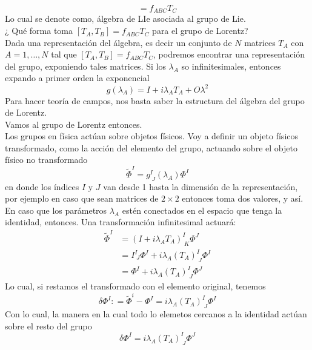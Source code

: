 \documentclass[../main.tex]{subfiles}
\begin{document}
\begin{equation*}
  [T_A,T_B] = f_{ABC}T_C
\end{equation*}
Lo cual se denote como, álgebra de LIe asociada al grupo de Lie. \\
¿ Qué forma toma $[T_A,T_B] = f_{ABC}T_C$ para el grupo de Lorentz? \\
Dada una representación del álgebra, es decir un conjunto de $N$ matrices $T_A$ con $A=1,\dots,N$ tal que $[T_A,T_B]=f_{ABC}T_C$, podremos encontrar una representación del grupo, exponiendo tales matrices. Si los $\lambda_A$ so infinitesimales, entonces expando a primer orden la exponencial
\begin{equation}
  g(\lambda_A) = I + i\lambda_AT_A + O{\lambda^2}
\end{equation}
Para hacer teoría de campos, nos basta saber la estructura del álgebra del grupo de Lorentz. \\
Vamos al grupo de Lorentz entonces. \\
Los grupos en física actúan sobre objetos físicos. Voy a definir un objeto físicos transformado, como la acción del elemento del grupo, actuando sobre el objeto físico no transformado
\begin{equation*}
  \tilde{\Phi}^I = g^I_{\; J}(\lambda_A)\Phi^I
\end{equation*}
en donde los índices $I$ y $J$ van desde 1 hasta la dimensión de la representación, por ejemplo en caso que sean matrices de $2\times 2$ entonces toma dos valores, y así. \\
En caso que los parámetros $\lambda_A$ estén conectados en el espacio que tenga la identidad, entonces. Una transformación infinitesimal actuará:
\begin{align*}
  \tilde{\Phi}^I & = \left( I + i\lambda_A T_A \right)^I_{\; K}\Phi^J \\
  & = I^I_{\; J} \Phi^I + i\lambda_A \left(T_A\right)^I_{\; J}\Phi^I \\
  & = \Phi^I + i\lambda_A \left(T_A\right)^I_{\;J}\Phi^J 
\end{align*}
Lo cual, si restamos el transformado con el elemento original, tenemos
\begin{equation*}
  \delta \Phi^I : = \tilde{\Phi}^i - \Phi^I = i\lambda_A\left(T_A\right)^I_{\; J}\Phi^I 
\end{equation*}
Con lo cual, la manera en la cual todo lo elemetos cercanos a la identidad actúan sobre el resto del grupo
\begin{equation}
  \boxed{  \delta \Phi^I  = i\lambda_A\left(T_A\right)^I_{\; J}\Phi^J}
\end{equation}
\end{document}
